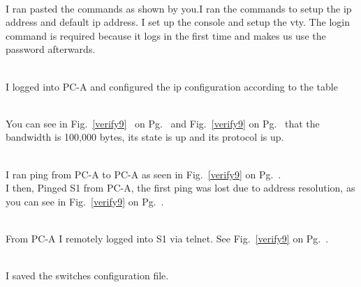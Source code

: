 \documentclass[../EngineeringJournal_CDavis.tex]{subfiles}
\begin{document}
\\
I ran pasted the commands as shown by you.I ran the commands to setup the ip 
address and default ip address. I set up the console and setup the vty. 
The login command is required because it logs in
the first time and makes us use the password afterwards.


\noindent{}\\
I logged into PC-A and configured the ip configuration according to the table


\\
You can see in Fig.~\ref{verify9}~ 
on Pg.~\pageref{verify9} and Fig.~\ref{verify9} on
Pg.~\pageref{verify9} that the bandwidth is 100,000 bytes,  its state is up and
its protocol is up.


\noindent{}\\
I ran ping from PC-A to PC-A as seen in
Fig.~\ref{verify9} on Pg.~\pageref{verify9}.\\
I then, Pinged S1 from PC-A, the first ping was lost due to address
resolution, as you can see in Fig.~\ref{verify9} on
Pg.~\pageref{verify9}.


\noindent{}\\
From PC-A I remotely logged into S1 via telnet. See
Fig.~\ref{verify9} on Pg.~\pageref{verify9}.


\noindent{}\\
I saved the switches configuration file.
\end{document}
